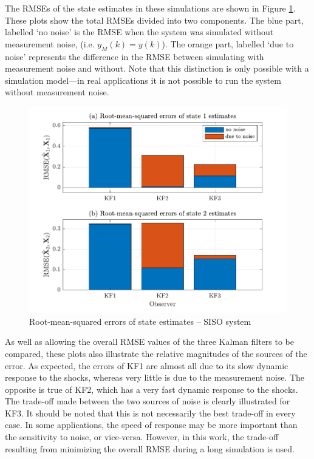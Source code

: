 The RMSEs of the state estimates in these simulations are shown in Figure \ref{fig:rod-obs-sim1-KF123-xest-RMSE-bar}. These plots show the total RMSEs divided into two components. The blue part, labelled `no noise' is the RMSE when the system was simulated without measurement noise, (i.e. $y_M(k)=y(k)$). The orange part, labelled `due to noise' represents the difference in the RMSE between simulating with measurement noise and without. Note that this distinction is only possible with a simulation model---in real applications it is not possible to run the system without measurement noise.
\begin{figure}[htp]
	\centering
	\includegraphics[width=12cm]{images/rod_obs_sim1_all_seed_x_err_bar_KF123.pdf}
	\caption{Root-mean-squared errors of state estimates – SISO system}
	\label{fig:rod-obs-sim1-KF123-xest-RMSE-bar}
\end{figure}

As well as allowing the overall RMSE values of the three Kalman filters to be compared, these plots also illustrate the relative magnitudes of the sources of the error. As expected, the errors of KF1 are almost all due to its slow dynamic response to the shocks, whereas very little is due to the measurement noise. The opposite is true of KF2, which has a very fast dynamic response to the shocks. The trade-off made between the two sources of noise is clearly illustrated for KF3. It should be noted that this is not necessarily the best trade-off in every case. In some applications, the speed of response may be more important than the sensitivity to noise, or vice-versa. However, in this work, the trade-off resulting from minimizing the overall RMSE during a long simulation is used.

